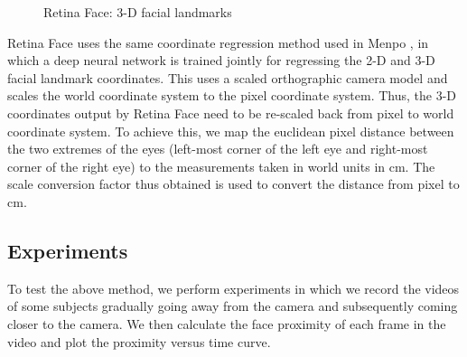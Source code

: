 \begin{figure}[h]
{{    }}
    \caption{Retina Face: 3-D facial landmarks}
    \label{fig:retinaFace3Dlandmarks}
\end{figure}

Retina Face uses the same coordinate regression method used in Menpo \citep{menpo}, in which a deep neural network is trained jointly for regressing the 2-D and 3-D facial landmark coordinates. This uses a scaled orthographic camera model and scales the world coordinate system to the pixel coordinate system. Thus, the 3-D coordinates output by Retina Face need to be re-scaled back from pixel to world coordinate system. To achieve this, we map the euclidean pixel distance between the two extremes of the eyes (left-most corner of the left eye and right-most corner of the right eye) to the measurements taken in world units in cm. The scale conversion factor thus obtained is used to convert the distance from pixel to cm.


\subsection{Experiments}
To test the above method, we perform experiments in which we record the videos of some subjects gradually going away from the camera and subsequently coming closer to the camera. We then calculate the face proximity of each frame in the video and plot the proximity versus time curve.

